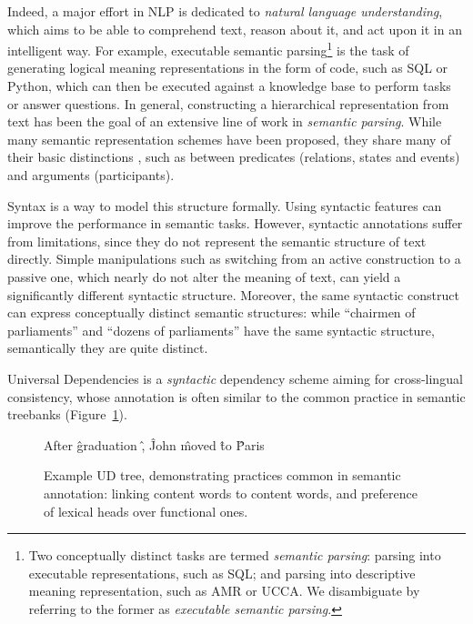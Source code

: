 \documentclass[12pt,a4paper]{report}
\begin{document}
Indeed, a major effort in NLP is dedicated to \textit{natural language understanding},
which aims to be able to comprehend text, reason about it, and act upon it
in an intelligent way.
For example, executable semantic parsing\footnote{Two conceptually distinct
tasks are termed \textit{semantic parsing}: parsing into
executable representations, such as SQL; and parsing into descriptive meaning
representation, such as AMR or UCCA.
We disambiguate by referring to the former as \textit{executable semantic parsing}.}
is the task of generating logical meaning representations in the form of code, such as
SQL or Python, which can then be executed against a knowledge base to perform
tasks or answer questions.
In general, constructing a hierarchical representation from text has been the
goal of an extensive line of work in \textit{semantic parsing}.
While many semantic representation schemes have been proposed,
they share many of their basic distinctions \citep{abend2017state},
such as between predicates
(relations, states and events) and arguments (participants).

Syntax is a way to
model this structure formally. Using syntactic features can improve the
performance in semantic tasks.
However, syntactic annotations suffer from limitations, since they do not
represent the semantic structure of text directly. Simple manipulations such as
switching from an active construction to a passive one, which nearly do not
alter the meaning of text, can yield a significantly different syntactic
structure. Moreover, the same syntactic construct can express conceptually
distinct semantic structures: while ``chairmen of parliaments'' and
``dozens of parliaments'' have the same syntactic structure, semantically
they are quite distinct.

Universal Dependencies \citep{nivre2016universal}
is a \textit{syntactic} dependency scheme aiming for cross-lingual consistency,
whose annotation is often similar to the common practice in semantic treebanks
(Figure~\ref{fig:original_example_ud}).

\begin{figure}[t]
  \centering
    \begin{dependency}[text only label, label style={above,font=\tt}, font=\small]
    \begin{deptext}[column sep=.8em,ampersand replacement=\^]
    After \^ graduation \^ , \^ John \^ moved \^ to \^ Paris \\
    \end{deptext}
    \end{dependency}
\caption{Example UD tree, demonstrating practices common in semantic annotation:
linking content words to content words, and preference of lexical heads over functional ones.
\label{fig:original_example_ud}}
\end{figure}
\end{document}
